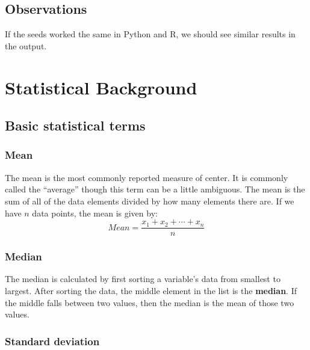 \documentclass[]{book}
\begin{document}
\hypertarget{observations}{%
\section{Observations}\label{observations}}

If the seeds worked the same in Python and R, we should see similar results in the output.

\cleardoublepage

\hypertarget{appendix-appendix}{%
\appendix}


\hypertarget{appendixA}{%
\chapter{Statistical Background}\label{appendixA}}

\hypertarget{basic-statistical-terms}{%
\section{Basic statistical terms}\label{basic-statistical-terms}}

\hypertarget{mean}{%
\subsection{Mean}\label{mean}}

The mean is the most commonly reported measure of center. It is commonly called the ``average'' though this term can be a little ambiguous. The mean is the sum of all of the data elements divided by how many elements there are. If we have \(n\) data points, the mean is given by: \[Mean = \frac{x_1 + x_2 + \cdots + x_n}{n}\]

\hypertarget{median}{%
\subsection{Median}\label{median}}

The median is calculated by first sorting a variable's data from smallest to largest. After sorting the data, the middle element in the list is the \textbf{median}. If the middle falls between two values, then the median is the mean of those two values.

\hypertarget{standard-deviation}{%
\subsection{Standard deviation}\label{standard-deviation}}
\end{document}
